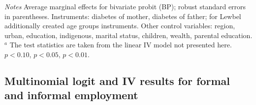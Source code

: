 \begin{table}[p]
\begin{center}
\begin{adjustbox}{max width=\textwidth, center}
\begin{threeparttable}
{\begin{tabular}{l*{4}{S S}}
\end{tabular}
\begin{tablenotes}
\item \footnotesize \textit{Notes}  Average marginal effects for bivariate probit (BP); robust standard errors in parentheses. Instruments: diabetes of mother, diabetes of father; for Lewbel additionally created age groups instruments. Other control variables: region, urban, education, indigenous, marital status, children, wealth, parental education. $^a$ The test statistics are taken from the linear IV model not presented here.
\sym{*} \(p<0.10\), \sym{**} \(p<0.05\), \sym{***} \(p<0.01\).
\end{tablenotes}
}
\end{threeparttable} 
\end{adjustbox}
\end{center}
\end{table}


\clearpage


\subsection*{Multinomial logit and IV results for formal and informal employment}


